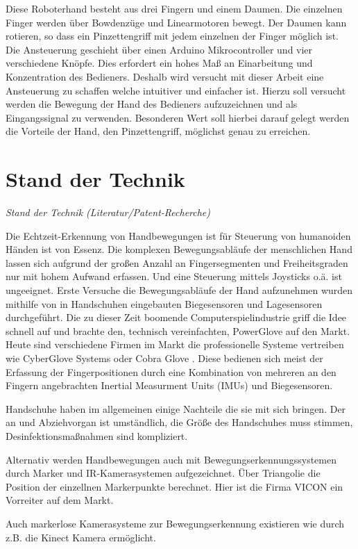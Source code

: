 \documentclass[a4paper,12pt,final]{article} %
\numberwithin{equation}{section} %
\numberwithin{figure}{section} %
\numberwithin{table}{section} %
\begin{document}
Diese Roboterhand besteht aus drei Fingern und einem Daumen. Die einzelnen Finger werden über Bowdenzüge und Linearmotoren bewegt. Der Daumen kann rotieren, so dass ein Pinzettengriff mit jedem einzelnen der Finger möglich ist.
Die Ansteuerung geschieht über einen Arduino Mikrocontroller und vier verschiedene Knöpfe. Dies erfordert ein hohes Maß an Einarbeitung und Konzentration des Bedieners.
Deshalb wird versucht mit dieser Arbeit eine Ansteuerung zu schaffen welche intuitiver und einfacher ist. Hierzu soll versucht werden die Bewegung der Hand des Bedieners aufzuzeichnen und als Eingangssignal zu verwenden.
Besonderen Wert soll hierbei darauf gelegt werden die Vorteile der Hand, den Pinzettengriff, möglichst genau zu erreichen.
\newpage
\section{Stand der Technik}
\emph{Stand der Technik (Literatur/Patent-Recherche)}

Die Echtzeit-Erkennung von Handbewegungen ist für Steuerung von humanoiden Händen ist von Essenz. Die komplexen Bewegungsabläufe der menschlichen Hand lassen sich aufgrund der großen Anzahl an Fingersegmenten und Freiheitsgraden nur mit hohem Aufwand erfassen. Und eine Steuerung mittels Joysticks o.ä. ist ungeeignet.
Erste Versuche die Bewegungsabläufe der Hand aufzunehmen wurden mithilfe von in Handschuhen eingebauten Biegesensoren \cite{FlexSensor} und Lagesensoren durchgeführt.  Die zu dieser Zeit boomende Computerspielindustrie griff die Idee schnell auf und brachte den, technisch vereinfachten, PowerGlove \cite{PowerGlove} auf den Markt. Heute sind verschiedene Firmen im Markt die professionelle Systeme vertreiben wie CyberGlove Systems \cite{CyberGlove} oder Cobra Glove \cite{CobraGlove}. Diese bedienen sich meist der Erfassung der Fingerpositionen durch eine Kombination von mehreren an den Fingern angebrachten Inertial Measurment Units (IMUs) und Biegesensoren.

Handschuhe haben im allgemeinen einige Nachteile die sie mit sich bringen. Der an und Abziehvorgan ist umständlich, die Größe des Handschuhes muss stimmen, Desinfektionsmaßnahmen sind kompliziert.

Alternativ werden Handbewegungen auch mit Bewegungserkennungssystemen durch Marker und IR-Kamerasystemen aufgezeichnet. Über Triangolie die Position der einzellnen Markerpunkte berechnet. Hier ist die Firma VICON ein Vorreiter auf dem Markt.

Auch markerlose Kamerasysteme zur Bewegungserkennung existieren wie durch z.B. die Kinect Kamera ermöglicht.
\end{document}
